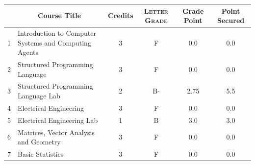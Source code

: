 \documentclass[11pt]{article}
\newcommand*{\numtwo}[1]{\pgfmathprintnumber[
                    fixed, precision=2, fixed zerofill=true]{#1}}
\begin{document}
                \begin{center}
                    \renewcommand{\arraystretch}{1.08}
                    
                \begin{tabular}{|c|l|c|>{\scshape}c|c|c|}
                \hline  \rule[-1ex]{0pt}{3.5ex} {\centering{\bf Course Code}} &  \multicolumn{1}{c|}{\textbf{Course Title}}  & {\bf Credits} & {\bf Letter Grade} & {\bf Grade Point} & {\bf Point Secured}  \\ 
                \hline   1 &  Introduction to Computer Systems and Computing Agents		 & 3 & F & 0.0 & 0.0 \\ %
                \hline   2 &  Structured Programming Language		 & 3 & F & 0.0 & 0.0 \\ %
                \hline   3 &  Structured Programming Language Lab		 & 2 & B- & 2.75 & 5.5 \\ %
                \hline   4 &  Electrical Engineering		 & 3 & F & 0.0 & 0.0 \\ %
                \hline   5 &  Electrical Engineering Lab		 & 1 & B & 3.0 & 3.0 \\ %
                \hline   6 &  Matrices, Vector Analysis and Geometry		 & 3 & F & 0.0 & 0.0 \\ %
                \hline   7 &  Basic Statistics		 & 3 & F & 0.0 & 0.0 \\ %

\hline                %
                \end{tabular}
                \end{center}
                \renewcommand{\arraystretch}{1.03}
\end{document}
